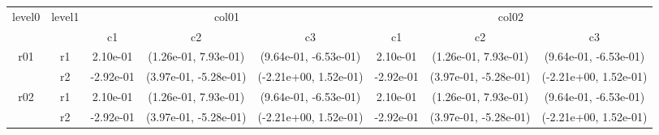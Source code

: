 \begin{tabular}{cccccccc}
\toprule
\multirow{2}{*}{level0} & \multirow{2}{*}{level1}&\multicolumn{3}{c}{col01}&\multicolumn{3}{c}{col02}\tabularnewline
\cmidrule(lr){3-5}
\cmidrule(lr){6-8}
&&c1&c2&c3&c1&c2&c3\tabularnewline
\midrule
\midrule
\multirow{2}{*}{r01}&r1&2.10e-01& (1.26e-01, 7.93e-01)& (9.64e-01, -6.53e-01)&2.10e-01& (1.26e-01, 7.93e-01)& (9.64e-01, -6.53e-01)\tabularnewline
&r2&-2.92e-01& (3.97e-01, -5.28e-01)& (-2.21e+00, 1.52e-01)&-2.92e-01& (3.97e-01, -5.28e-01)& (-2.21e+00, 1.52e-01)\tabularnewline
\midrule
\multirow{2}{*}{r02}&r1&2.10e-01& (1.26e-01, 7.93e-01)& (9.64e-01, -6.53e-01)&2.10e-01& (1.26e-01, 7.93e-01)& (9.64e-01, -6.53e-01)\tabularnewline
&r2&-2.92e-01& (3.97e-01, -5.28e-01)& (-2.21e+00, 1.52e-01)&-2.92e-01& (3.97e-01, -5.28e-01)& (-2.21e+00, 1.52e-01)\tabularnewline
\bottomrule
\end{tabular}
